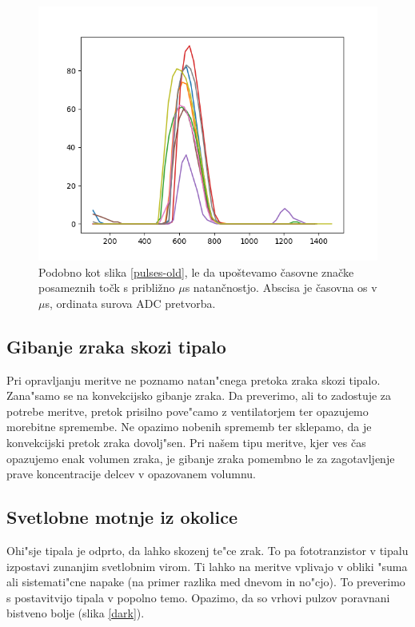\documentclass[12pt,a4paper]{article}
\begin{document}
\begin{figure}[H]
	\begin{center}
		\includegraphics[width=12cm]{aligned.png}
		\caption{Podobno kot slika \ref{pulses-old}, le da upoštevamo časovne značke posameznih točk s približno $\mu$s natančnostjo. Abscisa je časovna os v $\mu$s, ordinata surova ADC pretvorba.}
		\label{aligned}
	\end{center}
\end{figure}

\subsection{Gibanje zraka skozi tipalo}
Pri opravljanju meritve ne poznamo natan"cnega pretoka zraka skozi tipalo. Zana"samo se na konvekcijsko gibanje zraka. Da preverimo, ali to zadostuje za potrebe meritve, pretok prisilno pove"camo z ventilatorjem ter opazujemo morebitne spremembe. Ne opazimo nobenih sprememb ter sklepamo, da je konvekcijski pretok zraka dovolj"sen. Pri našem tipu meritve, kjer ves čas opazujemo enak volumen zraka, je gibanje zraka pomembno le za zagotavljenje prave koncentracije delcev v opazovanem volumnu. 

\subsection{Svetlobne motnje iz okolice}
Ohi"sje tipala je odprto, da lahko skozenj te"ce zrak. To pa fototranzistor v tipalu izpostavi zunanjim svetlobnim virom. Ti lahko na meritve vplivajo v obliki "suma ali sistemati"cne napake (na primer razlika med dnevom in no"cjo). To preverimo s postavitvijo tipala v popolno temo. Opazimo, da so vrhovi pulzov poravnani bistveno bolje (slika \ref{dark}). 
\end{document}
